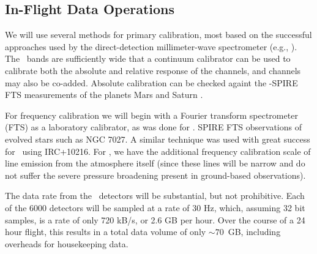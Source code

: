 \subsection{In-Flight Data Operations}

We will use several methods for primary calibration, most based on the
successful approaches used by the direct-detection millimeter-wave
spectrometer \zspec (e.g.,
).  The \name\ bands
are sufficiently wide that a continuum calibrator can be used to
calibrate both the absolute and relative response of the channels, and
channels may also be co-added.  Absolute calibration can be checked againt the \herschel-SPIRE FTS measurements of the 
planets Mars \citep{swinyard10mars} and Saturn \citep{fletcher12}.


For frequency calibration we will begin with a Fourier transform
spectrometer (FTS) as a laboratory calibrator, as was done for \zspec.
\herschel\-SPIRE FTS observations of evolved stars 
\citep{groenewegen11,wesson11} such as NGC 7027.
A similar technique was used with
great success for \zspec\ using IRC+10216.  For \name, we have the additional
frequency calibration scale of line emission from the atmosphere
itself (since these lines will be narrow and do not suffer the severe
pressure broadening present in ground-based observations).


The data rate from the \name\ detectors will be substantial, but not
prohibitive.  Each of the 6000 detectors will be sampled at a rate of
30 Hz, which, assuming 32 bit samples, is a rate of only 720 kB/s, or
2.6 GB per hour.  Over the course of a 24 hour flight, this results in
a total data volume of only $\sim70$~GB, including overheads for
housekeeping data.

